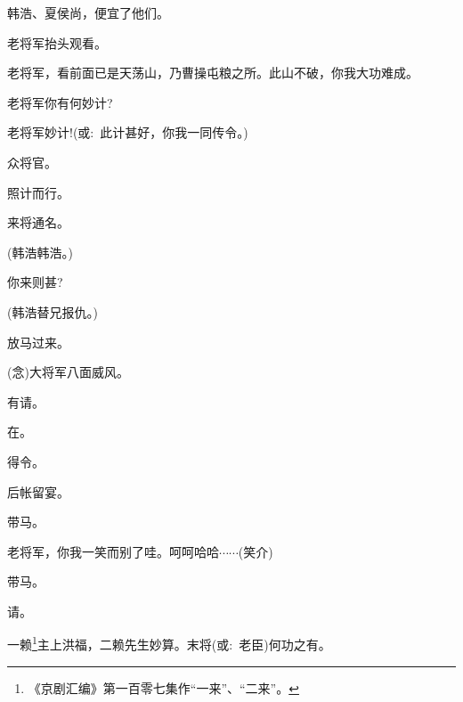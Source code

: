 {韩浩、夏侯尚，便宜了他们。

老将军抬头观看。

老将军，看前面已是天荡山，乃曹操屯粮之所。此山不破，你我大功难成。

老将军你有何妙计?

老将军妙计!({\akai 或}:~此计甚好，你我一同传令。)

众将官。

照计而行。

\vspace{5pt}



来将通名。

(韩浩\hspace{30pt}韩浩。)

你来则甚?

(韩浩\hspace{30pt}替兄报仇。)

放马过来。



\vspace{5pt}

({\akai 念})大将军八面威风。

有请。

在。

得令。

后帐留宴。

带马。

老将军，你我一笑而别了哇。呵呵哈哈$\cdots{}\cdots{}$({\hwfs 笑介})

带马。

\vspace{5pt}

请。

一赖\footnote{《京剧汇编》第一百零七集作``一来''、``二来''。}主上洪福，二赖先生妙算。末将({\akai 或}:~老臣)何功之有。

}
